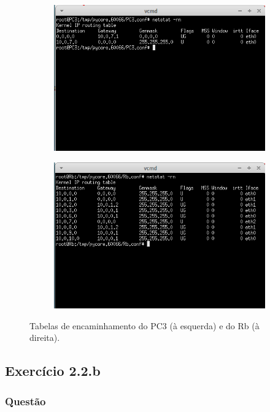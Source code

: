 \documentclass{llncs}
\begin{document}
\begin{figure}[h]
	\centering
	\begin{subfigure}{.5\textwidth}
		\centering
		\includegraphics[width=0.95\linewidth]{./imagens/netstatPC3.png}
	\end{subfigure}
	\begin{subfigure}{.5\textwidth}
		\centering
		\includegraphics[width=0.95\linewidth]{./imagens/netstatRb.png}
	\end{subfigure}
	\caption{Tabelas de encaminhamento do PC3 (à esquerda) e do Rb (à direita).}
	\label{fig:r_s}
\end{figure}

\subsection{Exercício 2.2.b}
\subsubsection{Questão}\rule[-10pt]{0pt}{10pt}\\
\end{document}
